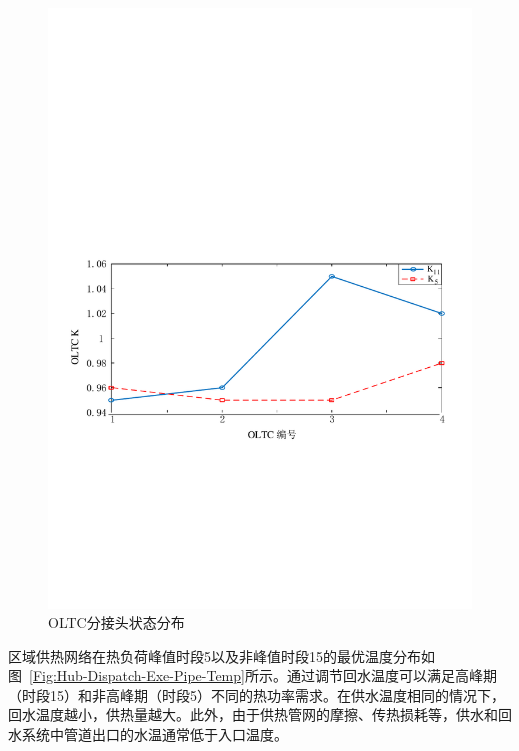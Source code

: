 \begin{figure}[H]
\centering
\includegraphics[scale=0.65]{figures/Chap4-15-Hub-Dispatch-Exe-OLTC-K.pdf}
\caption{OLTC分接头状态分布}
\label{Fig:Hub-Dispatch-Exe-OLTC-K}
\end{figure}

区域供热网络在热负荷峰值时段5以及非峰值时段15的最优温度分布如图~\ref{Fig:Hub-Dispatch-Exe-Pipe-Temp}所示。通过调节回水温度可以满足高峰期（时段15）和非高峰期（时段5）不同的热功率需求。在供水温度相同的情况下，回水温度越小，供热量越大。此外，由于供热管网的摩擦、传热损耗等，供水和回水系统中管道出口的水温通常低于入口温度。

